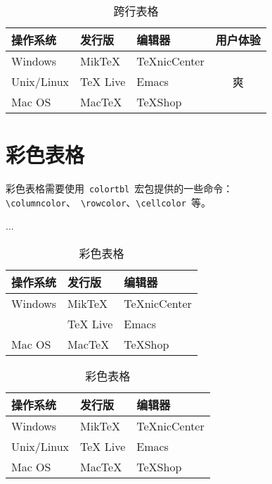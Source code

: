 \begin{table}[htbp]
\caption{跨行表格}
\centering
\begin{tabular}{lllc}
    \toprule
    操作系统 & 发行版 & 编辑器 & 用户体验 \\
    \midrule
    Windows & MikTeX & TeXnicCenter & 
    \multirow{3}{*}{\centering 爽} \\
    Unix/Linux & TeX Live & Emacs \\
    Mac OS & MacTeX & TeXShop \\
    \bottomrule
\end{tabular}
\end{table}

\section{彩色表格}
彩色表格需要使用~\verb|colortbl|~宏包\citep{Carlisle_2001}提供的一些命令：\verb|\columncolor|、~\verb|\rowcolor|、\verb|\cellcolor|~等。
\begin{code}
\usepackage{colortbl}
...
\begin{table}[htbp]
\caption{彩色表格}
\centering
\begin{tabular}{lll}
    \toprule
    操作系统 & 发行版 & 编辑器 \\
    \midrule
    Windows & MikTeX & TeXnicCenter \\
\end{code}
\begin{code}
    \rowcolor[gray]{.8} Unix/Linux & TeX Live & Emacs \\
    Mac OS & MacTeX & TeXShop \\
    \bottomrule
\end{tabular}
\end{table}
\end{code}

\begin{table}[htbp]
\caption{彩色表格}
\centering
\begin{tabular}{lll}
    \toprule
    操作系统 & 发行版 & 编辑器 \\
    \midrule
    Windows & MikTeX & TeXnicCenter \\
    \rowcolor[gray]{.8} Unix/Linux & TeX Live & Emacs \\
    Mac OS & MacTeX & TeXShop \\
    \bottomrule
\end{tabular}
\end{table}

